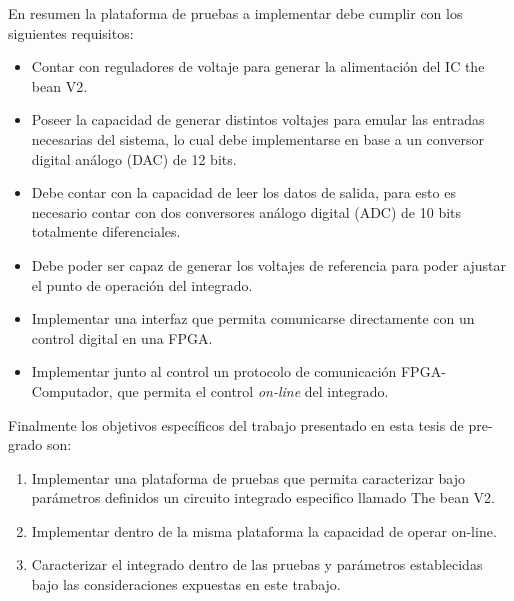 En resumen la plataforma de pruebas a implementar debe cumplir con los siguientes requisitos:
\begin{itemize}
\item Contar con reguladores de voltaje para generar la alimentación del IC the bean V2.
\item Poseer la capacidad de generar distintos voltajes para emular las entradas necesarias del sistema, lo cual debe implementarse en base a un conversor digital análogo (DAC) de 12 bits.
\item Debe contar con la capacidad de leer los datos de salida, para esto es necesario contar con dos conversores análogo digital (ADC) de 10 bits totalmente diferenciales.
\item  Debe poder ser capaz de generar los voltajes de referencia para poder ajustar el punto de operación del integrado.
\item Implementar una interfaz que permita comunicarse directamente con un control digital en una FPGA.
\item Implementar junto al control un protocolo de comunicación FPGA-Computador, que permita el control \textit{on-line} del integrado.
\end{itemize}


Finalmente los objetivos específicos del trabajo presentado en esta tesis de pre-grado son:
\begin{enumerate}
\item Implementar una plataforma de pruebas que permita caracterizar bajo parámetros definidos un circuito integrado especifico llamado The bean V2.
\item Implementar dentro de la misma plataforma la capacidad de operar on-line.
\item Caracterizar el integrado dentro de las pruebas y parámetros establecidas bajo las consideraciones expuestas en este trabajo.
\end{enumerate}